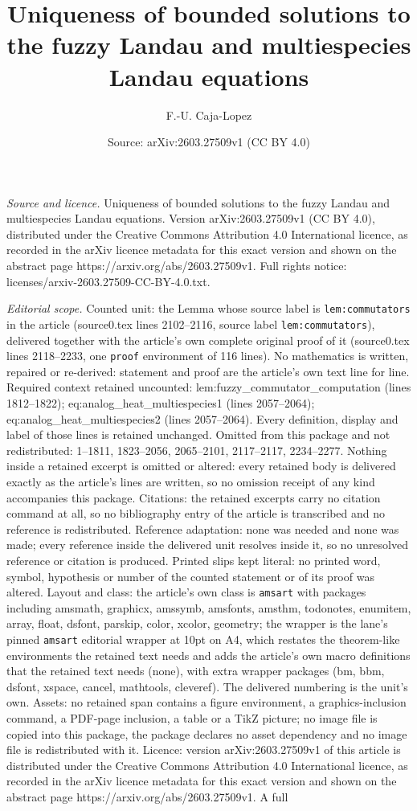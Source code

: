 \documentclass[10pt,a4paper]{amsart}
\title[Uniqueness of bounded solutions to the fuzzy Landau and mult]{Uniqueness of bounded solutions to the fuzzy Landau and multiespecies Landau equations}
\author{F.-U. Caja-Lopez}
\date{Source: arXiv:2603.27509v1 (CC BY 4.0)}
\begin{document}
\maketitle

\noindent\emph{Source and licence.} Uniqueness of bounded solutions to the fuzzy Landau and multiespecies Landau equations. Version arXiv:2603.27509v1 (CC BY 4.0), distributed under the Creative Commons Attribution 4.0 International licence, as recorded in the arXiv licence metadata for this exact version and shown on the abstract page https://arxiv.org/abs/2603.27509v1. Full rights notice: licenses/arxiv-2603.27509-CC-BY-4.0.txt.\par\smallskip

\noindent\textit{Editorial scope.} Counted unit: the Lemma whose source label is \texttt{lem:commutators} in the article (source0.tex lines 2102--2116, source label \texttt{lem:commutators}), delivered together with the article's own complete original proof of it (source0.tex lines 2118--2233, one \texttt{proof} environment of 116 lines). No mathematics is written, repaired or re-derived: statement and proof are the article's own text line for line. Required context retained uncounted: lem:fuzzy\_commutator\_computation (lines 1812--1822); eq:analog\_heat\_multiespecies1 (lines 2057--2064); eq:analog\_heat\_multiespecies2 (lines 2057--2064). Every definition, display and label of those lines is retained unchanged. Omitted from this package and not redistributed: 1--1811, 1823--2056, 2065--2101, 2117--2117, 2234--2277. Nothing inside a retained excerpt is omitted or altered: every retained body is delivered exactly as the article's lines are written, so no omission receipt of any kind accompanies this package. Citations: the retained excerpts carry no citation command at all, so no bibliography entry of the article is transcribed and no reference is redistributed. Reference adaptation: none was needed and none was made; every reference inside the delivered unit resolves inside it, so no unresolved reference or citation is produced. Printed slips kept literal: no printed word, symbol, hypothesis or number of the counted statement or of its proof was altered. Layout and class: the article's own class is \texttt{amsart} with packages including amsmath, graphicx, amssymb, amsfonts, amsthm, todonotes, enumitem, array, float, dsfont, parskip, color, xcolor, geometry; the wrapper is the lane's pinned \texttt{amsart} editorial wrapper at 10pt on A4, which restates the theorem-like environments the retained text needs and adds the article's own macro definitions that the retained text needs (none), with extra wrapper packages (bm, bbm, dsfont, xspace, cancel, mathtools, cleveref). The delivered numbering is the unit's own. Assets: no retained span contains a figure environment, a graphics-inclusion command, a PDF-page inclusion, a table or a TikZ picture; no image file is copied into this package, the package declares no asset dependency and no image file is redistributed with it. Licence: version arXiv:2603.27509v1 of this article is distributed under the Creative Commons Attribution 4.0 International licence, as recorded in the arXiv licence metadata for this exact version and shown on the abstract page https://arxiv.org/abs/2603.27509v1. A full 
\end{document}

